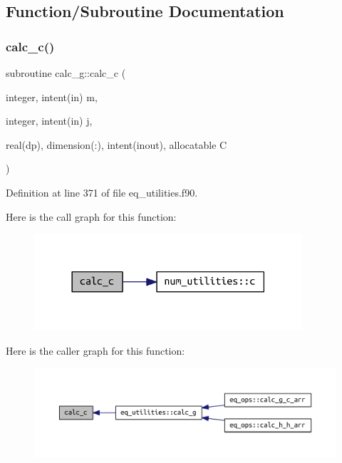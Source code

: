 \subsection{Function/\+Subroutine Documentation}
\mbox{\label{eq__utilities_8f90_aea9f92b0bbcd253100a9d3bc727fd9b4}} 
\subsubsection{\texorpdfstring{calc\+\_\+c()}{calc\_c()}}
{\footnotesize\ttfamily subroutine calc\+\_\+g\+::calc\+\_\+c (\begin{DoxyParamCaption}\item[{integer, intent(in)}]{m,  }\item[{integer, intent(in)}]{j,  }\item[{real(dp), dimension(\+:), intent(inout), allocatable}]{C }\end{DoxyParamCaption})}



Definition at line 371 of file eq\+\_\+utilities.\+f90.

Here is the call graph for this function\+:
\nopagebreak
\begin{figure}[H]
\begin{center}
\leavevmode
\includegraphics[width=282pt]{eq__utilities_8f90_aea9f92b0bbcd253100a9d3bc727fd9b4_cgraph}
\end{center}
\end{figure}
Here is the caller graph for this function\+:
\nopagebreak
\begin{figure}[H]
\begin{center}
\leavevmode
\includegraphics[width=350pt]{eq__utilities_8f90_aea9f92b0bbcd253100a9d3bc727fd9b4_icgraph}
\end{center}
\end{figure}
